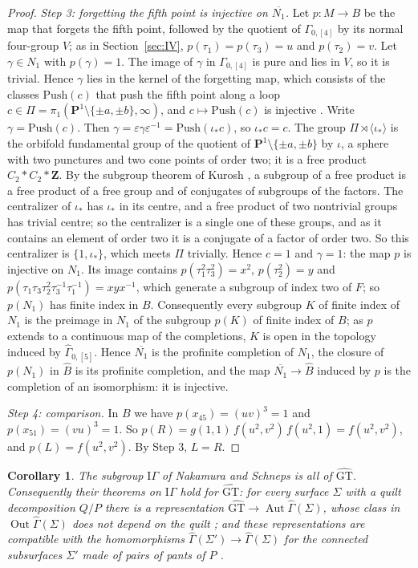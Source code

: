\documentclass[11pt,a4paper]{article}
\theoremstyle{plain}
\newtheorem{corollary}[theorem]{Corollary}
\theoremstyle{definition}
\theoremstyle{remark}
\newcommand{\GT}{\widehat{\mathrm{GT}}}
\newcommand{\Z}{\mathbf Z}
\newcommand{\Bh}{\widehat B}
\newcommand{\Gh}{\widehat\Gamma}
\newcommand{\Aut}{\operatorname{Aut}}
\newcommand{\Out}{\operatorname{Out}}
\begin{document}
\begin{proof}
\emph{Step 3: forgetting the fifth point is injective on $\overline{N_1}$.} Let $p:M\to B$ be the map that forgets
the fifth point, followed by the quotient of $\Gamma_{0,[4]}$ by its normal four-group $V$; as in
Section~\ref{sec:IV}, $p(\tau_1)=p(\tau_3)=u$ and $p(\tau_2)=v$. Let $\gamma\in N_1$ with $p(\gamma)=1$. The image of
$\gamma$ in $\Gamma_{0,[4]}$ is pure and lies in $V$, so it is trivial. Hence $\gamma$ lies in the kernel of the
forgetting map, which consists of the classes $\mathrm{Push}(c)$ that push the fifth point along a loop
$c\in\Pi=\pi_1(\mathbf P^1\setminus\{\pm a,\pm b\},\infty)$, and $c\mapsto\mathrm{Push}(c)$ is injective \cite{Bi}.
Write $\gamma=\mathrm{Push}(c)$. Then $\gamma=\varepsilon\gamma\varepsilon^{-1}=\mathrm{Push}(\iota_*c)$, so
$\iota_*c=c$. The group $\Pi\rtimes\langle\iota_*\rangle$ is the orbifold fundamental group of the quotient of
$\mathbf P^1\setminus\{\pm a,\pm b\}$ by $\iota$, a sphere with two punctures and two cone points of order two; it
is a free product $C_2*C_2*\Z$. By the subgroup theorem of Kurosh \cite{Ku}, a subgroup of a free product is a free
product of a free group and of conjugates of subgroups of the factors. The centralizer of $\iota_*$ has $\iota_*$
in its centre, and a free product of two nontrivial groups has trivial centre; so the centralizer is a single one of
these groups, and as it contains an element of order two it is a conjugate of a factor of order two. So this
centralizer is $\{1,\iota_*\}$, which meets $\Pi$ trivially. Hence $c=1$ and $\gamma=1$: the map $p$ is injective
on $N_1$. Its image contains $p(\tau_1^2\tau_3^2)=x^2$,
$p(\tau_2^2)=y$ and $p(\tau_1\tau_3\tau_2^2\tau_3^{-1}\tau_1^{-1})=xyx^{-1}$, which generate a subgroup of index
two of $F$; so $p(N_1)$ has finite index in $B$. Consequently every subgroup $K$ of finite index of $N_1$ is the
preimage in $N_1$ of the subgroup $p(K)$ of finite index of $B$; as $p$ extends to a continuous map of the
completions, $K$ is open in the topology induced by $\Gh_{0,[5]}$. Hence $\overline{N_1}$ is the profinite completion of $N_1$, the closure of $p(N_1)$ in $\Bh$ is its
profinite completion, and the map $\overline{N_1}\to\Bh$ induced by $p$ is the completion of an isomorphism: it is
injective.

\emph{Step 4: comparison.} In $B$ we have $p(x_{45})=(uv)^3=1$ and $p(x_{51})=(vu)^3=1$. So
$p(R)=g(1,1)\,f(u^2,v^2)\,f(u^2,1)=f(u^2,v^2)$, and $p(L)=f(u^2,v^2)$. By Step 3, $L=R$.
\end{proof}

\begin{corollary}\label{cor:IG}
The subgroup $\mathrm{I}\Gamma$ of Nakamura and Schneps \cite[Definition 1.1]{NS} is all of $\GT$. Consequently
their theorems on $\mathrm{I}\Gamma$ hold for $\GT$: for every surface $\Sigma$ with a quilt decomposition $Q/P$
there is a representation $\GT\to\Aut\Gh(\Sigma)$, whose class in $\Out\Gh(\Sigma)$ does not depend on the quilt
\cite[Theorem 1.3 and the text after it]{NS}; and these representations are compatible with the homomorphisms
$\Gh(\Sigma')\to\Gh(\Sigma)$ for the connected subsurfaces $\Sigma'$ made of pairs of pants of $P$
\cite[Theorem 1.4]{NS}.
\end{corollary}
\end{document}
